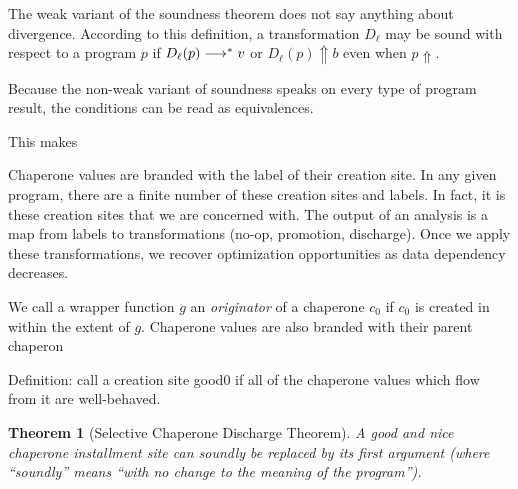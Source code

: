 \documentclass{sigplanconf}
\newtheorem{theorem}{Theorem}
\begin{document}
The weak variant of the soundness theorem does not say anything about divergence. According to this definition, a transformation $D_\ell$ may be sound with respect to a program $p$ if $D_\ell(p)\longrightarrow^{*} v$ or $D_\ell(p)\Uparrow b$ even when $p\Uparrow$.

Because the non-weak variant of soundness speaks on every type of program result, the conditions can be read as equivalences.

This makes 

Chaperone values are branded with the label of their creation site. In any given program, there are a finite number of these creation sites and labels. In fact, it is these creation sites that we are concerned with. The output of an analysis is a map from labels to transformations (no-op, promotion, discharge). Once we apply these transformations, we recover optimization opportunities as data dependency decreases.

We call a wrapper function $g$ an \emph{originator} of a chaperone $c_0$ if $c_0$ is created in within the extent of $g$. Chaperone values are also branded with their parent chaperon

Definition: call a creation site good0 if all of the chaperone values which flow from it are well-behaved.


\begin{theorem}[Selective Chaperone Discharge Theorem]
A good and nice chaperone installment site can soundly be replaced by its first argument (where ``soundly'' means ``with no change to the meaning of the program'').
\end{theorem}



\end{document}
